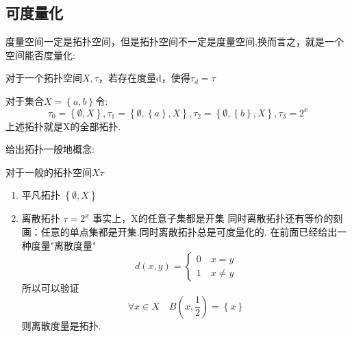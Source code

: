 \subsection*{可度量化}
度量空间一定是拓扑空间，但是拓扑空间不一定是度量空间,换而言之，就是一个空间能否度量化:
\begin{definition}[可度量化]
   对于一个拓扑空间\(X,\tau\)，若存在度量d，使得\({\tau}_d=\tau\) 
\end{definition}
\begin{example}
    对于集合\(X=\left\{a,b\right\}\)令:
    \[{\tau}_0=\left\{\emptyset,X\right\},{\tau}_1=\left\{\emptyset,\left\{a\right\},X\right\},{\tau}_2=\left\{\emptyset,\left\{b\right\},X\right\},{\tau}_3=2^{x}\]
    上述拓扑就是X的全部拓扑.
\end{example}
给出拓扑一般地概念:
\begin{definition}
    对于一般的拓扑空间\(X \tau\)
    \begin{enumerate}
        \item 平凡拓扑 \(\left\{\emptyset,X\right\} \)\\
        \item 离散拓扑 \(\tau = 2^x\) 事实上，X的任意子集都是开集 同时离散拓扑还有等价的刻画：任意的单点集都是开集.同时离散拓扑总是可度量化的.
                在前面已经给出一种度量"离散度量" \[d(x,y)=\begin{cases}
                    0 \quad x=y \\
                    1 \quad x\neq y
                \end{cases}\]
                所以可以验证\[\forall x \in X \quad B\left(x,\frac{1}{2}\right)=\left\{x\right\}\]
                则离散度量是拓扑.    
    \end{enumerate}
\end{definition}
